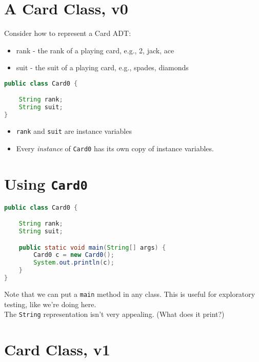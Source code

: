 \documentclass{article}
\begin{document}
\section{A Card Class, v0}



Consider how to represent a Card ADT:
\begin{itemize}
\item rank - the rank of a playing card, e.g., 2, jack, ace
\item suit - the suit of a playing card, e.g., spades, diamonds
\end{itemize}

\begin{lstlisting}[language=Java]
public class Card0 {

    String rank;
    String suit;
}
\end{lstlisting}

\begin{itemize}
\item {\tt rank} and {\tt suit} are instance variables
\item Every {\it instance} of {\tt Card0} has its own copy of instance variables.
\end{itemize}





\section{Using {\tt Card0}}



\begin{lstlisting}[language=Java]
public class Card0 {

    String rank;
    String suit;

    public static void main(String[] args) {
        Card0 c = new Card0();
        System.out.println(c);
    }
}
\end{lstlisting}

Note that we can put a {\tt main} method in any class. This is useful for exploratory testing, like we're doing here.\\

The {\tt String} representation isn't very appealing.  (What does it print?)





\section{Card Class, v1}
\end{document}
